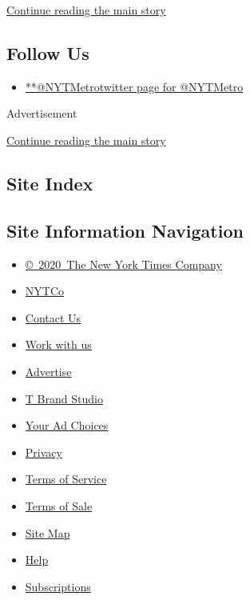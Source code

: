 \protect\hyperlink{after-mid2}{Continue reading the main story}

\hypertarget{follow-us}{%
\subsection{Follow Us}\label{follow-us}}

\begin{itemize}
\tightlist
\item
  \href{https://twitter.com/NYTMetro}{**@NYTMetrotwitter page for
  @NYTMetro}
\end{itemize}

Advertisement

\protect\hyperlink{after-mktg}{Continue reading the main story}

\hypertarget{site-index}{%
\subsection{Site Index}\label{site-index}}

\hypertarget{site-information-navigation}{%
\subsection{Site Information
Navigation}\label{site-information-navigation}}

\begin{itemize}
\tightlist
\item
  \href{https://help.nytimes.com/hc/en-us/articles/115014792127-Copyright-notice}{©~2020~The
  New York Times Company}
\end{itemize}

\begin{itemize}
\tightlist
\item
  \href{https://www.nytco.com/}{NYTCo}
\item
  \href{https://help.nytimes.com/hc/en-us/articles/115015385887-Contact-Us}{Contact
  Us}
\item
  \href{https://www.nytco.com/careers/}{Work with us}
\item
  \href{https://nytmediakit.com/}{Advertise}
\item
  \href{http://www.tbrandstudio.com/}{T Brand Studio}
\item
  \href{https://www.nytimes.com/privacy/cookie-policy\#how-do-i-manage-trackers}{Your
  Ad Choices}
\item
  \href{https://www.nytimes.com/privacy}{Privacy}
\item
  \href{https://help.nytimes.com/hc/en-us/articles/115014893428-Terms-of-service}{Terms
  of Service}
\item
  \href{https://help.nytimes.com/hc/en-us/articles/115014893968-Terms-of-sale}{Terms
  of Sale}
\item
  \href{https://spiderbites.nytimes.com}{Site Map}
\item
  \href{https://help.nytimes.com/hc/en-us}{Help}
\item
  \href{https://www.nytimes.com/subscription?campaignId=37WXW}{Subscriptions}
\end{itemize}
